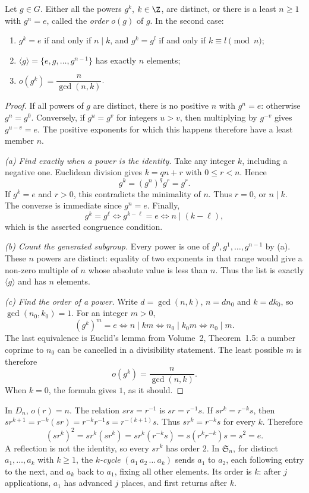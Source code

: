 \begin{proposition}\label{prop:order}
Let $g\in G$. Either all the powers $g^k$, $k\in\Z$, are distinct, or there is a least $n\ge1$ with $g^n=e$, called the \emph{order} $o(g)$ of $g$. In the second case:
\begin{enumerate}[label=(\alph*)]
\item $g^k=e$ if and only if $n\mid k$, and $g^k=g^l$ if and only if $k\equiv l\pmod n$;
\item $\langle g\rangle=\{e,g,\dots,g^{n-1}\}$ has exactly $n$ elements;
\item $o(g^k)=\dfrac n{\gcd(n,k)}$.
\end{enumerate}
\end{proposition}
\begin{proof}
If all powers of $g$ are distinct, there is no positive $n$
with $g^n=e$: otherwise $g^n=g^0$. Conversely, if
$g^u=g^v$ for integers $u>v$, then multiplying by $g^{-v}$
gives $g^{u-v}=e$. The positive exponents for which this
happens therefore have a least member $n$.

\emph{(a) Find exactly when a power is the identity.}
Take any integer $k$, including a negative one. Euclidean
division gives $k=qn+r$ with $0\le r<n$. Hence
\[
g^k=(g^n)^qg^r=g^r.
\]
If $g^k=e$ and $r>0$, this contradicts the minimality of $n$.
Thus $r=0$, or $n\mid k$. The converse is immediate since
$g^n=e$. Finally,
\[
g^k=g^\ell\iff g^{k-\ell}=e\iff n\mid(k-\ell),
\]
which is the asserted congruence condition.

\emph{(b) Count the generated subgroup.}
Every power is one of $g^0,g^1,\ldots,g^{n-1}$ by (a).
These $n$ powers are distinct: equality of two exponents
in that range would give a non-zero multiple of $n$ whose
absolute value is less than $n$. Thus the list is exactly
$\langle g\rangle$ and has $n$ elements.

\emph{(c) Find the order of a power.}
Write $d=\gcd(n,k)$, $n=dn_0$ and $k=dk_0$,
so $\gcd(n_0,k_0)=1$. For an integer $m>0$,
\[
(g^k)^m=e
\iff n\mid km
\iff n_0\mid k_0m
\iff n_0\mid m.
\]
The last equivalence is Euclid's lemma from Volume~2, Theorem~1.5:
a number coprime to $n_0$ can be cancelled in a divisibility
statement. The least possible $m$ is therefore
\[
\boxed{o(g^k)=\frac{n}{\gcd(n,k)}}.
\]
When $k=0$, the formula gives $1$, as it should.
\end{proof}

In $D_n$, $o(r)=n$. The relation $srs=r^{-1}$ is $sr=r^{-1}s$. If $sr^k=r^{-k}s$, then $sr^{k+1}=r^{-k}(sr)=r^{-k}r^{-1}s=r^{-(k+1)}s$. Thus $sr^k=r^{-k}s$ for every $k$. Therefore
\[
(sr^k)^2=sr^k(sr^k)=sr^k(r^{-k}s)=s(r^kr^{-k})s=s^2=e.
\]
A reflection is not the identity, so every $sr^k$ has order $2$. In $\mathfrak S_n$, for distinct $a_1,\ldots,a_k$ with $k\ge1$, the \emph{$k$-cycle} $(a_1\,a_2\,\ldots\,a_k)$ sends $a_1$ to $a_2$, each following entry to the next, and $a_k$ back to $a_1$, fixing all other elements. Its order is $k$: after $j$ applications, $a_1$ has advanced $j$ places, and first returns after $k$.

